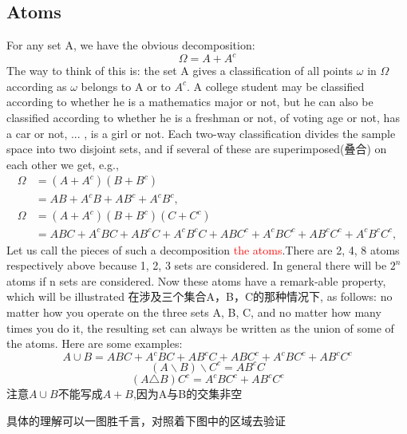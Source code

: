 \documentclass[12pt]{book}
\theoremstyle{definition}\newtheorem{dfn}{Définition}[chapter]
\theoremstyle{plain}\newtheorem{thm}{Théorème}[chapter]
\theoremstyle{plain}\newtheorem{prp}{Proposition}[chapter]
\theoremstyle{plain}\newtheorem{lem}{\bf Lemme}[chapter]
\theoremstyle{plain}\newtheorem{axm}{\bf Axiome}[chapter]
\theoremstyle{plain}\newtheorem{lmm}{\bf Lemme}[chapter]
\theoremstyle{plain}\newtheorem{cor}{\bf Corollaire}[chapter]
\theoremstyle{remark}\newtheorem{rem}{Remarque}[chapter]
\begin{document}
\subsection{Atoms}
For any set A, we have the obvious decomposition:
\begin{equation*}
\Omega=A+A^c
\end{equation*}
The way to think of this is: the set A gives a classiﬁcation of all points $\omega$ in $\Omega$ according as  $\omega$  belongs to A or to $A^c$. A college student may be classiﬁed according to whether he is a mathematics major or not, but he can also be classiﬁed according to whether he is a freshman or not, of voting age or not, has a car or not, ... , is a girl or not. Each two-way classiﬁcation divides the sample space into two disjoint sets, and if several of these are superimposed(叠合) on each other we get, e.g.,
$$\begin{aligned}
\Omega&=(A+A^c)(B+B^c)\\
&=AB+A^{c}B+AB^c+A^cB^c,\\
\Omega&=(A+A^c)(B+B^c)(C+C^c)\\
&=ABC+A^{c}BC+AB^cC+A^cB^cC+ABC^c+A^{c}BC^c+AB^cC^c+A^cB^cC^c,
\end{aligned}$$
Let us call the pieces of such a decomposition \textcolor{red}{the atoms}.There are 2, 4, 8 atoms respectively above because 1, 2, 3 sets are considered. In general there will be $2^n$ atoms if n sets are considered. Now these atoms have a remark-able property, which will be illustrated 在涉及三个集合A，B，C的那种情况下, as follows: no matter how you operate on the three sets A, B, C, and no matter how many times you do it, the resulting set can always be written as the union of some of the atoms. Here are some examples:
\begin{equation*}
A\cup B=ABC
+A^{c}BC+AB^cC+ABC^c
+A^{c}BC^c+AB^cC^c
\end{equation*}
\begin{equation*}
(A\backslash
B)\backslash C^c=AB^cC
\end{equation*}
\begin{equation*}
(A\triangle B)C^c=A^{c}BC^c+AB^cC^c
\end{equation*}
注意$A\cup B$不能写成$A+B$,因为A与B的交集非空

具体的理解可以一图胜千言，对照着下图中的区域去验证
\end{document}
